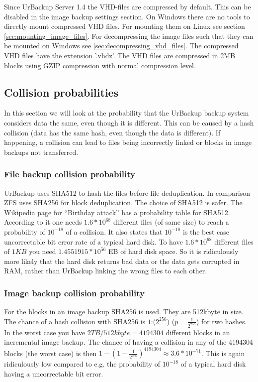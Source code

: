 \documentclass[a4paper,10pt]{article}
\begin{document}
Since UrBackup Server 1.4 the VHD-files are compressed by default. This can be disabled in the image backup settings section. On Windows there are no tools to directly mount compressed VHD files. For mounting them on Linux see section \ref{sec:mounting_image_files}. For decompressing the image files such that they can be mounted on Windows see \ref{sec:decompressing_vhd_files}. The compressed VHD files have the extension '.vhdz'. The VHD files are compressed in 2MB blocks using GZIP compression with normal compression level.

\subsection{Collision probabilities}


In this section we will look at the probability that the UrBackup backup system considers data the same, even though it is different. This can be caused by a hash collision (data has the same hash, even though the data is different). If happening, a collision can lead to files being incorrectly linked or blocks in image backups not transferred.

\subsubsection{File backup collision probability}

UrBackup uses SHA512 to hash the files before file deduplication. In comparison ZFS uses SHA256 for block deduplication. The choice of SHA512 is safer. The Wikipedia page for ``Birthday attack'' has a probability table for SHA512. According to it one needs $1.6*10^{68}$ different files (of same size) to reach a probability of $10^{-18}$ of a collision. It also states that $10^{-18}$ is the best case uncorrectable bit error rate of a typical hard disk. To have $1.6*10^{68}$ different files of $1KB$ you need $1.4551915*10^{56}$ EB of hard disk space. So it is ridiculously more likely that the hard disk returns bad data or the data gets corrupted in RAM, rather than UrBackup linking the wrong files to each other.

\subsubsection{Image backup collision probability}

For the blocks in an image backup SHA256 is used. They are 512kbyte in size. The chance of a hash collision with SHA256 is $1$:($2^{256}$) ($p=\frac{1}{2^{256}}$) for two hashes. In the worst case you have $2TB/512kbyte = 4194304$ different blocks in an incremental image backup. The chance of having a collision in any of the 4194304 blocks (the worst case) is then $1-(1-\frac{1}{2^{256}})^{4194304} \approx 3.6*10^{-71}$. This is again ridiculously low compared to e.g. the probability of $10^{-18}$ of a typical hard disk having a uncorrectable bit error.
\end{document}
